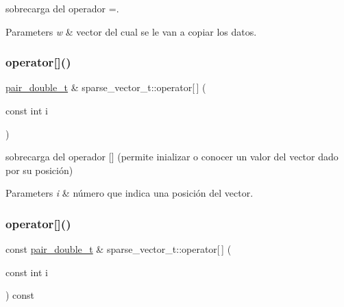 sobrecarga del operador =. 


\begin{DoxyParams}{Parameters}
{\em w} & vector del cual se le van a copiar los datos. \\
\hline
\end{DoxyParams}
\mbox{\label{classsparse__vector__t_a6ebb64d89a60aac881dcb62dfefaa398}} 
\subsubsection{\texorpdfstring{operator[]()}{operator[]()}\hspace{0.1cm}{\footnotesize\ttfamily [1/2]}}
{\footnotesize\ttfamily \hyperlink{classpair__t}{pair\+\_\+double\+\_\+t} \& sparse\+\_\+vector\+\_\+t\+::operator\mbox{[}$\,$\mbox{]} (\begin{DoxyParamCaption}\item[{const int}]{i }\end{DoxyParamCaption})}



sobrecarga del operador \mbox{[}\mbox{]} (permite inializar o conocer un valor del vector dado por su posición) 


\begin{DoxyParams}{Parameters}
{\em i} & número que indica una posición del vector. \\
\hline
\end{DoxyParams}
\mbox{\label{classsparse__vector__t_a158bad89a8bc495ff018b32bf13fe44d}} 
\subsubsection{\texorpdfstring{operator[]()}{operator[]()}\hspace{0.1cm}{\footnotesize\ttfamily [2/2]}}
{\footnotesize\ttfamily const \hyperlink{classpair__t}{pair\+\_\+double\+\_\+t} \& sparse\+\_\+vector\+\_\+t\+::operator\mbox{[}$\,$\mbox{]} (\begin{DoxyParamCaption}\item[{const int}]{i }\end{DoxyParamCaption}) const}



